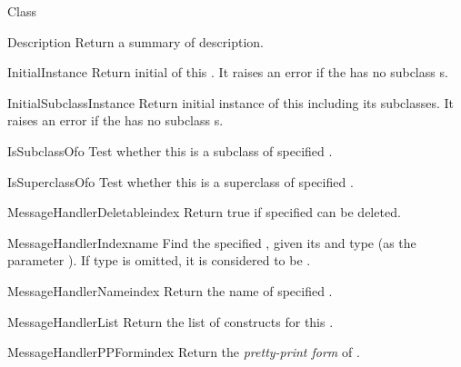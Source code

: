 \begin{classdesc*}{Class}
\begin{methoddesc}{Description}{}
Return a summary of  description.
\end{methoddesc}

\begin{methoddesc}{InitialInstance}{}
Return initial  of this . It raises an
error if the  has no subclass s.
\end{methoddesc}

\begin{methoddesc}{InitialSubclassInstance}{}
Return initial instance of this  including its subclasses. It
raises an error if the  has no subclass s.
\end{methoddesc}

\begin{methoddesc}{IsSubclassOf}{o}
Test whether this  is a subclass of specified .
\end{methoddesc}

\begin{methoddesc}{IsSuperclassOf}{o}
Test whether this  is a superclass of specified
.
\end{methoddesc}

\begin{methoddesc}{MessageHandlerDeletable}{index}
Return true if specified  can be deleted.
\end{methoddesc}

\begin{methoddesc}{MessageHandlerIndex}{name }
Find the specified , given its  and type
(as the parameter ). If type is omitted, it is considered to
be .
\end{methoddesc}

\begin{methoddesc}{MessageHandlerName}{index}
Return the name of specified .
\end{methoddesc}

\begin{methoddesc}{MessageHandlerList}{}
Return the list of  constructs for this
.
\end{methoddesc}

\begin{methoddesc}{MessageHandlerPPForm}{index}
Return the \emph{pretty-print form} of .
\end{methoddesc}


\end{classdesc*}
